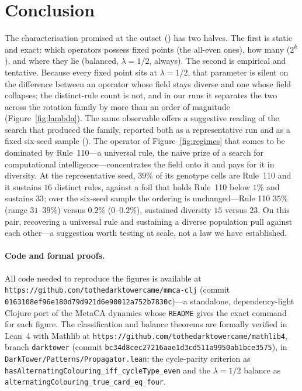 \documentclass[man,12pt,floatsintext]{apa7}
\newcommand{\secref}[1]{\emph{\nameref{#1}}}
\begin{document}
\section{Conclusion}
\label{sec:conclusion}

The characterisation promised at the outset (\secref{sec:object}) has two
halves. The
first is static and exact: which operators possess fixed points (the
all-even ones), how many ($2^k$), and where they lie (balanced,
$\lambda = 1/2$, always). The second is empirical and tentative. Because
every fixed point sits at $\lambda = 1/2$, that parameter is silent on the
difference between an operator whose field stays diverse and one whose field
collapses; the distinct-rule count is not, and in our
runs it separates the two across the rotation family by more than an order of
magnitude (Figure~\ref{fig:lambda}). The same observable offers a suggestive
reading of the search that produced the family, reported both as a
representative run and as a fixed six-seed sample (\secref{sec:limits}). The
operator of Figure~\ref{fig:regimes} that comes to be dominated by
Rule~110---a universal rule, the naive prize of a search for computational
intelligence---concentrates the field onto it and pays for it in diversity.
At the representative seed, $39\%$ of its genotype cells are Rule~110 and it
sustains $16$ distinct rules, against a foil that holds Rule~110 below $1\%$
and sustains $33$; over the six-seed sample the ordering is unchanged---Rule
110 $35\%$ (range $31$--$39\%$) versus $0.2\%$ ($0$--$0.2\%$), sustained diversity
$15$ versus $23$. On this pair, recovering a universal rule and sustaining a
diverse population pull against each other---a suggestion worth testing at
scale, not a law we have established.

\paragraph{Code and formal proofs.} All code needed to reproduce the figures is
available at \texttt{https://github.com/tothedarktowercame/mmca-clj} (commit
\texttt{0163108ef96e180d79d921d6e90012a752b7830c})---a standalone,
dependency-light Clojure port of the MetaCA dynamics whose \texttt{README} gives
the exact command for each figure. The classification and balance theorems are
formally verified in Lean~4 with Mathlib at
\texttt{https://github.com/tothedarktowercame/mathlib4}, branch \texttt{darktower}
(commit \texttt{bc34d8cec27216aae1d3cd511a9950ab1bce3575}), in
\texttt{DarkTower/Patterns/Propagator.lean}: the cycle-parity criterion as
\texttt{hasAlternatingColouring\_iff\_cycleType\_even} and the $\lambda = 1/2$
balance as \texttt{alternatingColouring\_true\_card\_eq\_four}.

\printbibliography
\end{document}
